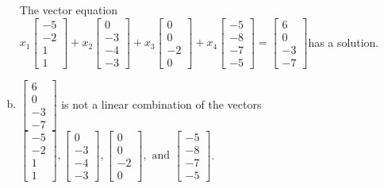 \begin{exerciseAnswer}
\begin{enumerate}[(a)]
\begin{center}
\begin{minipage}{0.8\textwidth}
 The vector equation \( x_{1} \left[\begin{array}{c}
-5 \\
-2 \\
1 \\
1
\end{array}\right] + x_{2} \left[\begin{array}{c}
0 \\
-3 \\
-4 \\
-3
\end{array}\right] + x_{3} \left[\begin{array}{c}
0 \\
0 \\
-2 \\
0
\end{array}\right] + x_{4} \left[\begin{array}{c}
-5 \\
-8 \\
-7 \\
-5
\end{array}\right] = \left[\begin{array}{c}
6 \\
0 \\
-3 \\
-7
\end{array}\right] \)has a solution.
\end{minipage}\end{center}
    
\item 

\( \left[\begin{array}{c}
6 \\
0 \\
-3 \\
-7
\end{array}\right] \) is not a linear combination of the vectors \( \left[\begin{array}{c}
-5 \\
-2 \\
1 \\
1
\end{array}\right] , \left[\begin{array}{c}
0 \\
-3 \\
-4 \\
-3
\end{array}\right] , \left[\begin{array}{c}
0 \\
0 \\
-2 \\
0
\end{array}\right] , \text{ and } \left[\begin{array}{c}
-5 \\
-8 \\
-7 \\
-5
\end{array}\right] \). 


\end{enumerate}
    
\end{exerciseAnswer}
    
